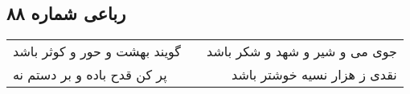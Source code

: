 \begin{center}
\section*{رباعی شماره ۸۸}
\label{sec:sh088}
\begin{longtable}{l p{0.5cm} r}
گویند بهشت و حور و کوثر باشد
&&
جوی می و شیر و شهد و شکر باشد
\\
پر کن قدح باده و بر دستم نه
&&
نقدی ز هزار نسیه خوشتر باشد
\\
\end{longtable}
\end{center}
